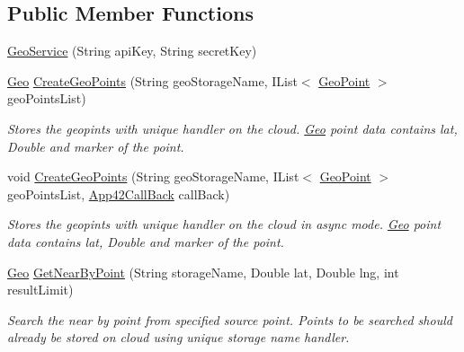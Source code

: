 \subsection*{Public Member Functions}
\begin{DoxyCompactItemize}
\item 
\hyperlink{classcom_1_1shephertz_1_1app42_1_1paas_1_1sdk_1_1csharp_1_1geo_1_1_geo_service_aecff3e5eca6aaa2a1563976ec2645045}{Geo\+Service} (String api\+Key, String secret\+Key)
\item 
\hyperlink{classcom_1_1shephertz_1_1app42_1_1paas_1_1sdk_1_1csharp_1_1geo_1_1_geo}{Geo} \hyperlink{classcom_1_1shephertz_1_1app42_1_1paas_1_1sdk_1_1csharp_1_1geo_1_1_geo_service_a784d23fd7625983661edfc33746da8fe}{Create\+Geo\+Points} (String geo\+Storage\+Name, I\+List$<$ \hyperlink{classcom_1_1shephertz_1_1app42_1_1paas_1_1sdk_1_1csharp_1_1geo_1_1_geo_point}{Geo\+Point} $>$ geo\+Points\+List)
\begin{DoxyCompactList}\small\item\em Stores the geopints with unique handler on the cloud. \hyperlink{classcom_1_1shephertz_1_1app42_1_1paas_1_1sdk_1_1csharp_1_1geo_1_1_geo}{Geo} point data contains lat, Double and marker of the point. \end{DoxyCompactList}\item 
void \hyperlink{classcom_1_1shephertz_1_1app42_1_1paas_1_1sdk_1_1csharp_1_1geo_1_1_geo_service_a7a77a5fe51599784dc51ad40c7f0075c}{Create\+Geo\+Points} (String geo\+Storage\+Name, I\+List$<$ \hyperlink{classcom_1_1shephertz_1_1app42_1_1paas_1_1sdk_1_1csharp_1_1geo_1_1_geo_point}{Geo\+Point} $>$ geo\+Points\+List, \hyperlink{interfacecom_1_1shephertz_1_1app42_1_1paas_1_1sdk_1_1csharp_1_1_app42_call_back}{App42\+Call\+Back} call\+Back)
\begin{DoxyCompactList}\small\item\em Stores the geopints with unique handler on the cloud in async mode. \hyperlink{classcom_1_1shephertz_1_1app42_1_1paas_1_1sdk_1_1csharp_1_1geo_1_1_geo}{Geo} point data contains lat, Double and marker of the point. \end{DoxyCompactList}\item 
\hyperlink{classcom_1_1shephertz_1_1app42_1_1paas_1_1sdk_1_1csharp_1_1geo_1_1_geo}{Geo} \hyperlink{classcom_1_1shephertz_1_1app42_1_1paas_1_1sdk_1_1csharp_1_1geo_1_1_geo_service_aa954313e4c8b15822da9566fdfeab681}{Get\+Near\+By\+Point} (String storage\+Name, Double lat, Double lng, int result\+Limit)
\begin{DoxyCompactList}\small\item\em Search the near by point from specified source point. Points to be searched should already be stored on cloud using unique storage name handler. \end{DoxyCompactList}\item 

\end{DoxyCompactItemize}
